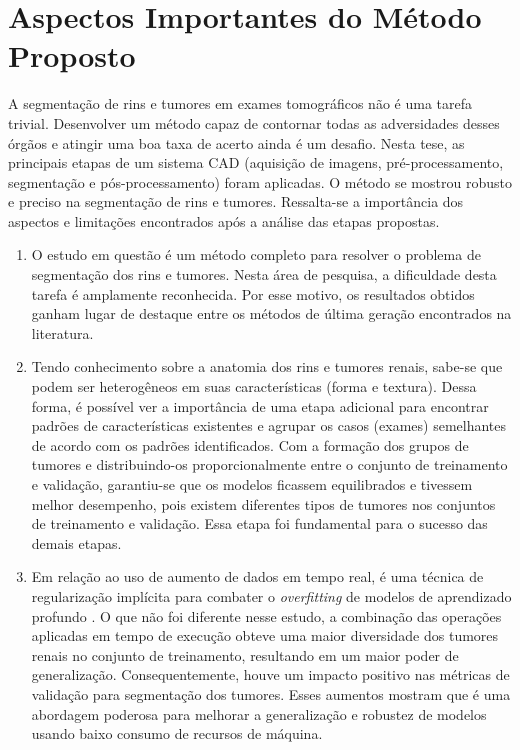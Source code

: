 \section{Aspectos Importantes do Método Proposto}
\label{sec:aspectos-importantes}

A segmentação de rins e tumores em exames tomográficos não é uma tarefa trivial. Desenvolver um método capaz de contornar todas as adversidades desses órgãos e atingir uma boa taxa de acerto ainda é um desafio. Nesta tese, as principais etapas de um sistema CAD (aquisição de imagens, pré-processamento, segmentação e pós-processamento) foram aplicadas. O método se mostrou robusto e preciso na segmentação de rins e tumores. Ressalta-se a importância dos aspectos e limitações encontrados após a análise das etapas propostas.

\begin{enumerate}
    \item O estudo em questão é um método completo para resolver o problema de segmentação dos rins e tumores. Nesta área de pesquisa, a dificuldade desta tarefa é amplamente reconhecida. Por esse motivo, os resultados obtidos ganham lugar de destaque entre os métodos de última geração encontrados na literatura.
    
    \item Tendo conhecimento sobre a anatomia dos rins e tumores renais, sabe-se que podem ser heterogêneos em suas características (forma e textura). Dessa forma, é possível ver a importância de uma etapa adicional para encontrar padrões de características existentes e agrupar os casos (exames) semelhantes de acordo com os padrões identificados. Com a formação dos grupos de tumores e distribuindo-os proporcionalmente entre o conjunto de treinamento e validação, garantiu-se que os modelos ficassem equilibrados e tivessem melhor desempenho, pois existem diferentes tipos de tumores nos conjuntos de treinamento e validação. Essa etapa foi fundamental para o sucesso das demais etapas.
    
    \item Em relação ao uso de aumento de dados em tempo real, é uma técnica de regularização implícita para combater o \textit{overfitting} de modelos de aprendizado profundo \cite{kukavcka2017regularization}. O que não foi diferente nesse estudo, a combinação das operações aplicadas em tempo de execução obteve uma maior diversidade dos tumores renais no conjunto de treinamento, resultando em um maior poder de generalização. Consequentemente, houve um impacto positivo nas métricas de validação para segmentação dos tumores. Esses aumentos mostram que é uma abordagem poderosa para melhorar a generalização e robustez de modelos usando baixo consumo de recursos de máquina.
    

\end{enumerate}
